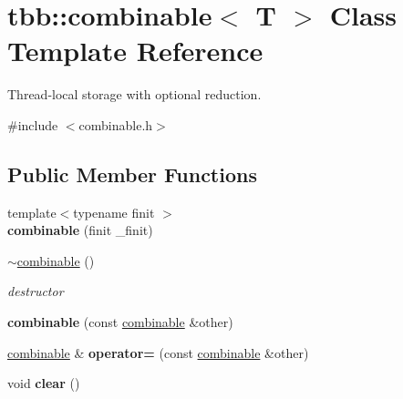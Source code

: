\hypertarget{classtbb_1_1combinable}{}\section{tbb\+:\+:combinable$<$ T $>$ Class Template Reference}
\label{classtbb_1_1combinable}


Thread-\/local storage with optional reduction.  




{\ttfamily \#include $<$combinable.\+h$>$}

\subsection*{Public Member Functions}
\begin{DoxyCompactItemize}
\item 
\hypertarget{classtbb_1_1combinable_ab3c539d5731faaafd81979b207a4fa1f}{}{\footnotesize template$<$typename finit $>$ }\\{\bfseries combinable} (finit \+\_\+finit)\label{classtbb_1_1combinable_ab3c539d5731faaafd81979b207a4fa1f}

\item 
\hypertarget{classtbb_1_1combinable_a52f00cf262d768048db72ab73c8f3ca4}{}\hyperlink{classtbb_1_1combinable_a52f00cf262d768048db72ab73c8f3ca4}{$\sim$combinable} ()\label{classtbb_1_1combinable_a52f00cf262d768048db72ab73c8f3ca4}

\begin{DoxyCompactList}\small\item\em destructor \end{DoxyCompactList}\item 
\hypertarget{classtbb_1_1combinable_a376f44cba71450fc18ccddaad61b76cc}{}{\bfseries combinable} (const \hyperlink{classtbb_1_1combinable}{combinable} \&other)\label{classtbb_1_1combinable_a376f44cba71450fc18ccddaad61b76cc}

\item 
\hypertarget{classtbb_1_1combinable_ab011fbe2f0600900b6e1b9760d82aead}{}\hyperlink{classtbb_1_1combinable}{combinable} \& {\bfseries operator=} (const \hyperlink{classtbb_1_1combinable}{combinable} \&other)\label{classtbb_1_1combinable_ab011fbe2f0600900b6e1b9760d82aead}

\item 
\hypertarget{classtbb_1_1combinable_a8ecfe80161a59f04ffd9676e79701de6}{}void {\bfseries clear} ()\label{classtbb_1_1combinable_a8ecfe80161a59f04ffd9676e79701de6}


\end{DoxyCompactItemize}
